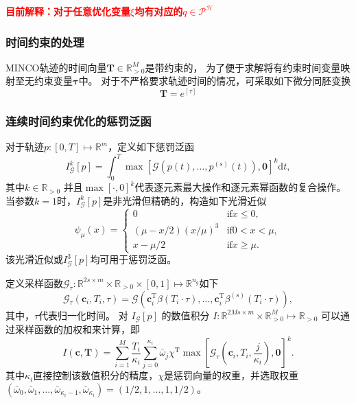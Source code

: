 \textcolor{red}{\textbf{目前解释：对于任意优化变量$\xi$均有对应的$q\in\mathcal{P}^{\mathcal{H}}$}}
\subsubsection{时间约束的处理}
    MINCO轨迹的时间向量$\mathbf{T}\in\mathbb{R}_{>0}^M$是带约束的，
    为了便于求解将有约束时间变量映射至无约束变量$\mathbf{\tau} $中。
    对于不严格要求轨迹时间的情况，可采取如下微分同胚变换
    \begin{equation}
        \mathbf{T}=e^{[\tau]}
    \end{equation}
\subsubsection{连续时间约束优化的惩罚泛函}
    对于轨迹$p:[0,T]\mapsto\mathbb{R}^m$，定义如下惩罚泛函
    \begin{equation}
        I_{\mathcal{G}}^k[p]=\int_0^T\max\left[\mathcal{G}(p(t),\ldots,p^{(s)}(t)),\mathbf{0}\right]^k \mathrm{d}t,
    \end{equation}
    其中$k\in\mathbb{R}_{>0}\text{ 并且}\max\left[\cdot,0\right]^k\text{代表逐元素最大操作和逐元素幂函数的复合操作。}$
    当参数$k=1$时，$I_{\mathcal{G}}^k[p]$是非光滑但精确的，构造如下光滑近似
    \begin{equation}
        \psi_\mu(x)=\begin{cases}0&\text{if} x\leq0,\\[2ex](\mu-x/2)\left(x/\mu\right)^3&\text{if} 0<x<\mu,\\[2ex]x-\mu/2&\text{if} x\geq\mu.\end{cases}
    \end{equation}
    该光滑近似或$I_{\mathcal{G}}^3[p]$均可用于惩罚泛函。

    
    定义采样函数$\mathcal{G}_\tau:\mathbb{R}^{2s\times m}\times\mathbb{R}_{>0}\times[0,1]\mapsto\mathbb{R}^{n_g}$如下
    \begin{equation}
        \mathcal{G}_\tau(\mathbf{c}_i,T_i,\tau)=\mathcal{G}\left(\mathbf{c}_i^\mathrm{T}\beta(T_i\cdot\tau),\ldots,\mathbf{c}_i^\mathrm{T}\beta^{(s)}(T_i\cdot\tau)\right),
    \end{equation}
    其中，$\tau$代表归一化时间。
    对 $I_\mathcal{G}[p]\text{ 的数值积分 }I:\mathbb{R}^{2Ms\times m}\times\mathbb{R}_{>0}^M\mapsto\mathbb{R}_{>0}$
    可以通过采样函数的加权和来计算，即
    \begin{equation}
        I(\mathbf{c},\mathbf{T})=\sum_{i=1}^M\frac{T_i}{\kappa_i}\sum_{j=0}^{\kappa_i}
        \bar{\omega}_j\chi^\mathrm{T}\max[\mathcal{G}_\tau(\mathbf{c}_i,T_i,\frac{j}{\kappa_i}),\mathbf{0}]^k.
    \end{equation}
    其中$\kappa_i$直接控制该数值积分的精度，$\chi$是惩罚向量的权重，并选取权重$(\bar{\omega}_0,\bar{\omega}_1,\ldots,\bar{\omega}_{\kappa_i-1},\bar{\omega}_{\kappa_i})=(1/2,1,\ldots,1,1/2)$。
